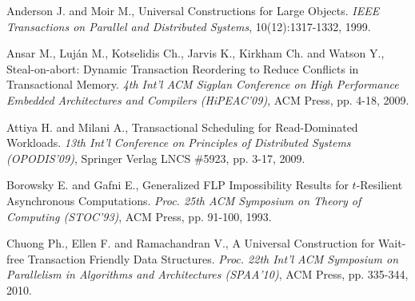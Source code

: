 \begin{thebibliography}{99}
{%
Anderson J. and Moir M., 
Universal Constructions for Large Objects. 
{\it  IEEE Transactions on Parallel and Distributed  Systems},
10(12):1317-1332,  1999.



Ansar M.,  Luj\'an M.,  Kotselidis Ch., Jarvis K.,  Kirkham Ch. 
and  Watson Y., 
Steal-on-abort: Dynamic Transaction Reordering to
Reduce Conflicts in Transactional Memory. 
{\it 4th  Int'l ACM Sigplan Conference on  High Performance Embedded  
Architectures and Compilers (HiPEAC'09)}, ACM Press,   pp. 4-18, 2009.





Attiya H. and Milani A., 
Transactional Scheduling for Read-Dominated Workloads. 
{\it 13th Int'l Conference on  Principles of Distributed Systems
(OPODIS'09)},  Springer Verlag  LNCS \#5923, pp. 3-17, 2009. 






Borowsky E. and Gafni E., 
Generalized FLP Impossibility Results for $t$-Resilient Asynchronous
Computations.
{\it Proc. 25th ACM  Symposium on Theory of Computing (STOC'93)}, 
ACM Press, pp. 91-100, 1993.


Chuong Ph., Ellen F. and Ramachandran V.,
A Universal Construction for Wait-free Transaction Friendly Data Structures.
{\it Proc. 22th  Int'l  ACM Symposium on Parallelism in Algorithms 
and Architectures   (SPAA'10)},  ACM Press, pp. 335-344,  2010. 

}
\end{thebibliography}
